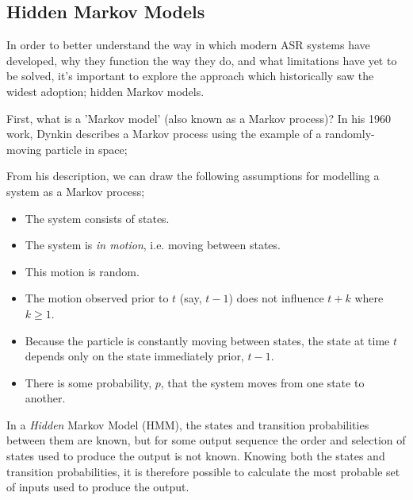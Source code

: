 \subsection{Hidden Markov Models}
In order to better understand the way in which modern ASR systems have developed, why they function the way they do, and what limitations have yet to be solved, it's important to explore the approach which historically saw the widest adoption; hidden Markov models.

First, what is a 'Markov model' (also known as a Markov process)?
In his 1960 work\cite{dynkin1960}, Dynkin describes a Markov process using the example of a randomly-moving particle in space;


From his description, we can draw the following assumptions for modelling a system as a Markov process;

\begin{itemize}
  \item The system consists of states.
  \item The system is \emph{in motion}, i.e. moving between states.
  \item This motion is random.
  \item The motion observed prior to $t$ (say, $t-1$) does not influence $t+k$ where $k \geq 1$.
  \item Because the particle is constantly moving between states, the state at time $t$ depends only on the state immediately prior, $t-1$.
  \item There is some probability, $p$, that the system moves from one state to another.
\end{itemize}

In a \emph{Hidden} Markov Model (HMM), the states and transition probabilities between them are known, but for some output sequence the order and selection of states used to produce the output is not known.
Knowing both the states and transition probabilities, it is therefore possible to calculate the most probable set of inputs used to produce the output.

